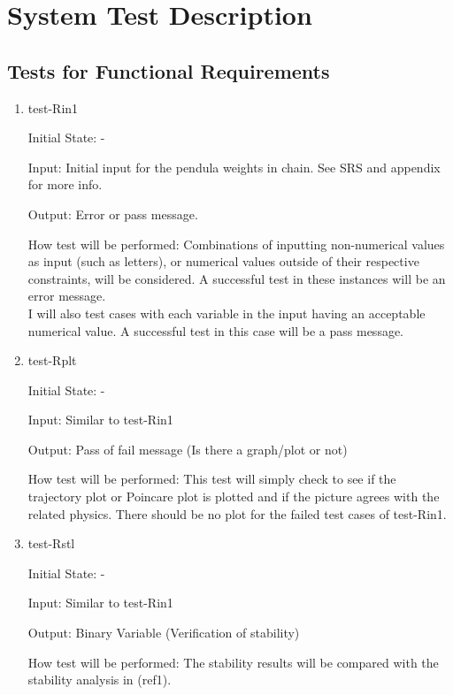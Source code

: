 \documentclass[12pt, titlepage]{article}
\begin{document}


\section{System Test Description}
	
\subsection{Tests for Functional Requirements}

\begin{enumerate}
\item{test-Rin1}	
				
Initial State: -
					
Input: Initial input for the pendula weights in chain. See SRS and appendix for 
more info.
					
Output: Error or pass message.
					
How test will be performed: Combinations of inputting non-numerical values as 
input  (such as letters), or numerical values outside of their respective 
constraints, will be considered. A successful test in these instances will be 
an error message. \\
I will also test cases with each variable in the input having an 
acceptable numerical value. A successful test in this case will be a pass 
message. 
					
\item{test-Rplt} 

Initial State: -

Input: Similar to test-Rin1 

Output: Pass of fail message (Is there a graph/plot or not)

How test will be performed: This test will simply check to see if the 
trajectory plot or Poincare plot is plotted and if the picture agrees with the 
related physics.
There should be no plot for the failed test cases of test-Rin1. 

\item{test-Rstl} 

Initial State: -

Input: Similar to test-Rin1 

Output: Binary Variable (Verification of stability) 

How test will be performed: The stability results will be compared with the 
stability analysis in (ref1). 

\end{enumerate}
\end{document}
